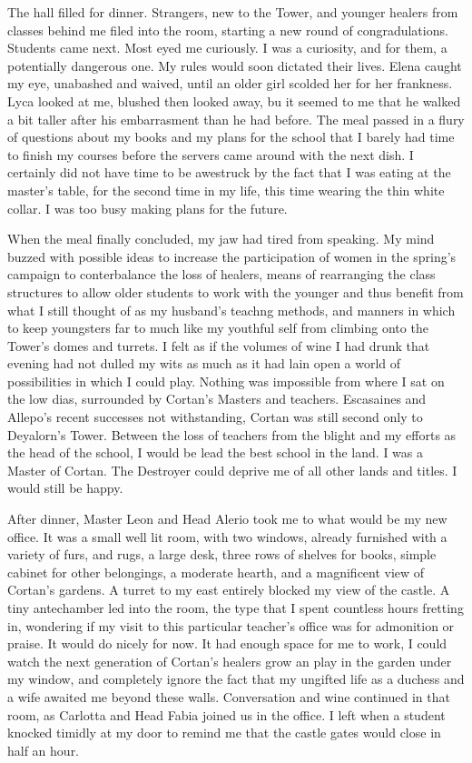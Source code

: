 \documentclass{article}
\begin{document}
The hall filled for dinner. Strangers, new to the Tower, and younger healers from classes behind me filed into the room, starting a new round of congradulations. Students came next. Most eyed me curiously. I was a curiosity, and for them, a potentially dangerous one. My rules would soon dictated their lives. Elena caught my eye, unabashed and waived, until an older girl scolded her for her frankness. Lyca looked at me, blushed then looked away, bu it seemed to me that he walked a bit taller after his embarrasment than he had before. The meal passed in a flury of questions about my books and my plans for the school that I barely had time to finish my courses before the servers came around with the next dish. I certainly did not have time to be awestruck by the fact that I was eating at the master's table, for the second time in my life, this time wearing the thin white collar. I was too busy making plans for the future. 

When the meal finally concluded, my jaw had tired from speaking. My mind buzzed with possible ideas to increase the participation of women in the spring's campaign to conterbalance the loss of healers, means of rearranging the class structures to allow older students to work with the younger and thus benefit from what I still thought of as my husband's teachng methods, and manners in which to keep youngsters far to much like my youthful self from climbing onto the Tower's domes and turrets. I felt as if the volumes of wine I had drunk that evening had not dulled my wits as much as it had lain open a world of possibilities in which I could play. Nothing was impossible from where I sat on the low dias, surrounded by Cortan's Masters and teachers. Escasaines and Allepo's recent successes not withstanding, Cortan was still second only to Deyalorn's Tower. Between the loss of teachers from the blight and my efforts as the head of the school, I would be lead the best school in the land. I was a Master of Cortan. The Destroyer could deprive me of all other lands and titles. I would still be happy.

After dinner, Master Leon and Head Alerio took me to what would be my new office. It was a small well lit room, with two windows, already furnished with a variety of furs, and rugs, a large desk, three rows of shelves for books, simple cabinet for other belongings, a moderate hearth, and a magnificent view of Cortan's gardens. A turret to my east entirely blocked my view of the castle. A tiny antechamber led into the room, the type that I spent countless hours fretting in, wondering if my visit to this particular teacher's office was for admonition or praise. It would do nicely for now. It had enough space for me to work, I could watch the next generation of Cortan's healers grow an play in the garden under my window, and completely ignore the fact that my ungifted life as a duchess and a wife awaited me beyond these walls. Conversation and wine continued in that room, as Carlotta and Head Fabia joined us in the office. I left when a student knocked timidly at my door to remind me that the castle gates would close in half an hour.
\end{document}
